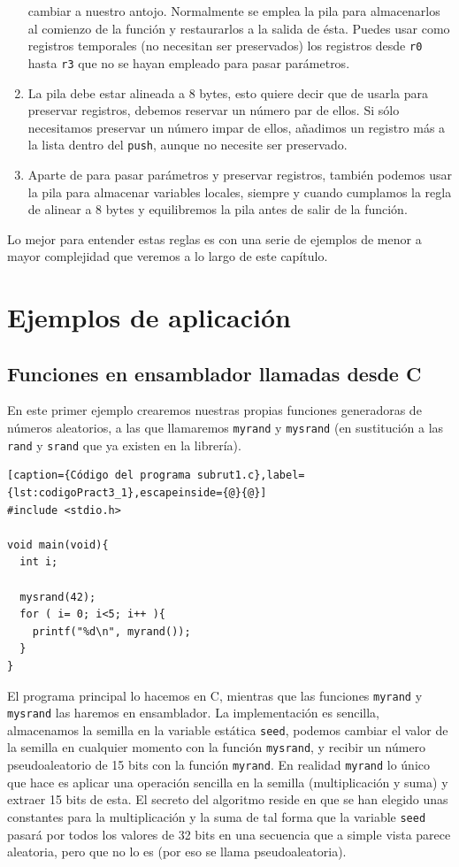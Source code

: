 \begin{enumerate}
        cambiar a nuestro antojo. Normalmente se emplea la pila para almacenarlos al comienzo de
        la función y restaurarlos a la salida de ésta. Puedes usar como registros temporales
        (no necesitan ser preservados) los registros desde {\tt r0} hasta {\tt r3} que no se hayan
        empleado para pasar parámetros.
  \item La pila debe estar alineada a 8 bytes, esto quiere decir que de usarla para preservar
        registros, debemos reservar un número par de ellos. Si sólo necesitamos preservar un
        número impar de ellos, añadimos un registro más a la lista dentro del {\tt push},
        aunque no necesite ser preservado.
  \item Aparte de para pasar parámetros y preservar registros, también podemos usar la pila
        para almacenar variables locales, siempre y cuando cumplamos la regla de alinear a
        8 bytes y equilibremos la pila antes de salir de la función.
\end{enumerate}

Lo mejor para entender estas reglas es con una serie de ejemplos de menor a mayor complejidad
que veremos a lo largo de este capítulo.

\section{Ejemplos de aplicación}

\subsection{Funciones en ensamblador llamadas desde C}

En este primer ejemplo crearemos nuestras propias funciones generadoras de números
aleatorios, a las que llamaremos {\tt myrand} y {\tt mysrand}
(en sustitución a las {\tt rand} y {\tt srand} que ya existen en la librería).

\begin{lstlisting}[caption={Código del programa subrut1.c},label={lst:codigoPract3_1},escapeinside={@}{@}]
#include <stdio.h>

void main(void){
  int i;

  mysrand(42);
  for ( i= 0; i<5; i++ ){
    printf("%d\n", myrand());
  }
}
\end{lstlisting}

El programa principal lo hacemos en C, mientras que las funciones {\tt myrand} y {\tt mysrand}
las haremos en ensamblador. La implementación es sencilla, almacenamos la semilla en la variable
estática {\tt seed}, podemos cambiar el valor de la semilla en cualquier momento con la función
{\tt mysrand}, y recibir un número pseudoaleatorio de 15 bits con la función {\tt myrand}.
En realidad {\tt myrand} lo único que hace es aplicar una operación sencilla en la semilla
(multiplicación y suma) y extraer 15 bits de esta. El secreto del algoritmo reside en que se
han elegido unas constantes para la multiplicación y la suma de tal forma que la variable 
{\tt seed} pasará por todos los valores de 32 bits en una secuencia que a simple vista parece
aleatoria, pero que no lo es (por eso se llama pseudoaleatoria).

